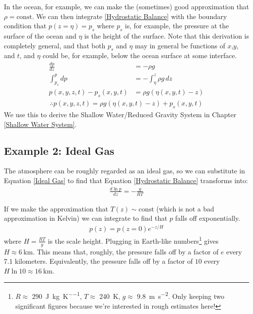 In the ocean, for example, we can make the (sometimes) good approximation that $\rho=\text{const}$. We can then integrate \ref{Hydrostatic Balance} with the boundary condition that $p(z=\eta)=p_s$ where $p_s$ is, for example, the pressure at the surface of the ocean and $\eta$ is the height of the surface. Note that this derivation is completely general, and that both $p_s$ and $\eta$ may in general be functions of $x$,$y$, and $t$, and $\eta$ could be, for example, below the ocean surface at some interface.
\begin{align*}
    \frac{d p}{d z}&=-\rho g\\
    \int_{p_s}^{p}dp&=-\int_{\eta}^{z}\rho g \, dz\\
    p(x,y,z,t)-p_s(x,y,t)&=\rho g (\eta(x,y,t)-z)
\end{align*}
\begin{align}
    \label{Const Density Hydrostatic}
    \therefore \boxed{p(x,y,z,t)=\rho g(\eta(x,y,t)-z)+p_s(x,y,t)}
\end{align}
We use this to derive the Shallow Water/Reduced Gravity System in Chapter \ref{Shallow Water System}.

\subsection{Example 2: Ideal Gas}\label{Example 2: Ideal Gas}

The atmosphere can be roughly regarded as an ideal gas, so we can substitute in Equation \ref{Ideal Gas} to find that Equation \ref{Hydrostatic Balance} transforms into:
\begin{align}
    \label{Hydrostatic Balance Ideal}
    \boxed{\frac{d\ln p}{dz}=-\frac{g}{RT}}
\end{align}

If we make the approximation that $T(z)\sim\text{const}$ (which is not a bad approximation in Kelvin) we can integrate to find that $p$ falls off exponentially.
\begin{align*}
    p(z)=p(z=0)e^{-z/H}
\end{align*}
where $H=\frac{RT}{g}$ is the scale height. Plugging in Earth-like numbers\footnote{
    $R\approx$ \qty{290}{\joule\per\kilogram\per\kelvin}, $T\approx$ \qty{240}{\kelvin}, $g\approx$ \qty{9.8}{\meter\per\square\second}. Only keeping two significant figures because we're interested in rough estimates here!
} gives $H\approx\qty{6}{\kilo\meter}$. This means that, roughly, the pressure falls off by a factor of $e$ every $7.1$ kilometers. Equivalently, the pressure falls off by a factor of $10$ every $H\ln 10\approx\qty{16}{\kilo\meter}$.

